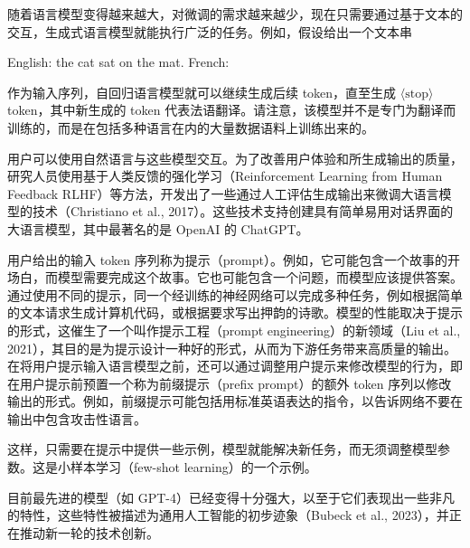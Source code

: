 \documentclass[../../main.tex]{subfiles}
\begin{document}
随着语言模型变得越来越大，对微调的需求越来越少，现在只需要通过基于文本的交互，生成式语言模型就能执行广泛的任务。例如，假设给出一个文本串

\begin{center}
English: the cat sat on the mat. French:
\end{center}

作为输入序列，自回归语言模型就可以继续生成后续 token，直至生成 $\langle\mathrm{stop}\rangle$ token，其中新生成的 token 代表法语翻译。请注意，该模型并不是专门为翻译而训练的，而是在包括多种语言在内的大量数据语料上训练出来的。

用户可以使用自然语言与这些模型交互。为了改善用户体验和所生成输出的质量，研究人员使用基于人类反馈的强化学习（Reinforcement Learning from Human Feedback RLHF）等方法，开发出了一些通过人工评估生成输出来微调大语言模型的技术（Christiano et al., 2017）。这些技术支持创建具有简单易用对话界面的大语言模型，其中最著名的是 OpenAI 的 ChatGPT。

用户给出的输入 token 序列称为提示（prompt）。例如，它可能包含一个故事的开场白，而模型需要完成这个故事。它也可能包含一个问题，而模型应该提供答案。通过使用不同的提示，同一个经训练的神经网络可以完成多种任务，例如根据简单的文本请求生成计算机代码，或根据要求写出押韵的诗歌。模型的性能取决于提示的形式，这催生了一个叫作提示工程（prompt engineering）的新领域（Liu et al., 2021），其目的是为提示设计一种好的形式，从而为下游任务带来高质量的输出。在将用户提示输入语言模型之前，还可以通过调整用户提示来修改模型的行为，即在用户提示前预置一个称为前缀提示（prefix prompt）的额外 token 序列以修改输出的形式。例如，前缀提示可能包括用标准英语表达的指令，以告诉网络不要在输出中包含攻击性语言。

这样，只需要在提示中提供一些示例，模型就能解决新任务，而无须调整模型参数。这是小样本学习（few-shot learning）的一个示例。

目前最先进的模型（如 GPT-4）已经变得十分强大，以至于它们表现出一些非凡的特性，这些特性被描述为通用人工智能的初步迹象（Bubeck et al., 2023），并正在推动新一轮的技术创新。
\end{document}
